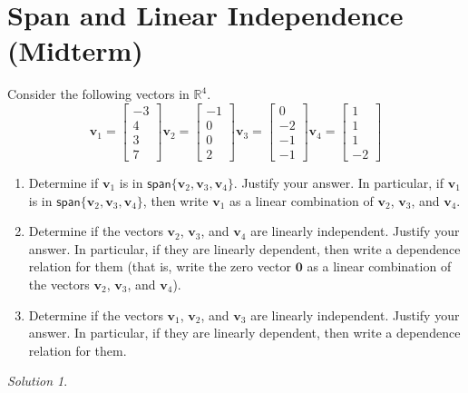 \documentclass{article}
\newcommand{\vv}[1]{\mathbf{#1}}
\newcommand{\vspan}{\mathsf{span}}
\theoremstyle{remark}
\newtheorem*{solution}{Solution}
\begin{document}
\section{Span and Linear Independence (Midterm)}
Consider the following vectors in $\mathbb R^4$.
\begin{displaymath}
  \mathbf v_1 =
  \begin{bmatrix}
    -3 \\
    4 \\
    3 \\
    7
  \end{bmatrix}
  \mathbf v_2 =
  \begin{bmatrix}
    -1 \\
    0 \\
    0 \\
    2
  \end{bmatrix}
  \mathbf v_3 =
  \begin{bmatrix}
    0 \\
    -2 \\
    -1 \\
    -1
  \end{bmatrix}
  \mathbf v_4 =
  \begin{bmatrix}
    1 \\
    1 \\
    1 \\
    -2
  \end{bmatrix}
\end{displaymath}
\begin{enumerate}
\item Determine if $\vv v_1$ is in $\vspan\{\vv v_2, \vv v_3, \vv v_4\}$.
  Justify your answer.
  In particular, if $\vv v_1$ is in $\vspan\{\vv v_2, \vv v_3, \vv v_4\}$, then write $\vv v_1$ as a linear combination of $\vv v_2$, $\vv v_3$, and $\vv v_4$.
\item Determine if the vectors $\vv v_2$, $\vv v_3$, and $\vv v_4$ are linearly independent.
  Justify your answer.
  In particular, if they are linearly dependent, then write a dependence relation for them (that is, write the zero vector $\vv 0$ as a linear combination of the vectors $\vv v_2$, $\vv v_3$, and $\vv v_4$).
\item Determine if the vectors $\vv v_1$, $\vv v_2$, and $\vv v_3$ are linearly independent.
  Justify your answer.
  In particular, if they are linearly dependent, then write a dependence relation for them.
\end{enumerate}

\begin{solution}
\end{solution}
\end{document}

